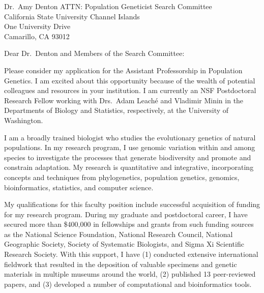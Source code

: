 \documentclass[letterpaper, 10pt]{letter}
\begin{document}
\begin{letter}{Dr.\ Amy Denton
                     ATTN: Population Geneticist Search Committee \\
                     California State University Channel Islands\\
                     One University Drive \\
                     Camarillo, CA 93012}
\opening{Dear Dr.\ Denton and Members of the Search Committee:}
Please consider my application for the Assistant Professorship in Population
Genetics.
I am excited about this opportunity because of the wealth of potential
colleagues and resources in your institution.
I am currently an NSF Postdoctoral Research Fellow working with Drs.\ Adam
Leach\'{e} and Vladimir Minin in the Departments of Biology and
Statistics, respectively, at the University of Washington.

I am a broadly trained biologist who studies the evolutionary genetics of
natural populations.
In my research program, I use genomic variation within and among species to
investigate the processes that generate biodiversity and promote and constrain
adaptation.
My research is quantitative and integrative, incorporating concepts and
techniques from phylogenetics, population genetics, genomics, bioinformatics,
statistics, and computer science.

My qualifications for this faculty position include successful acquisition
of funding for my research program.
During my graduate and postdoctoral career, I have secured more than
\$400,000 in fellowships and grants from such funding sources as the 
National Science Foundation,
National Research Council,
National Geographic Society,
Society of Systematic Biologists, and
Sigma Xi Scientific Research Society.
With this support, I have
(1) conducted extensive international fieldwork that resulted in
the deposition of valuable specimens and genetic materials in multiple
museums around the world,
(2) published 13 peer-reviewed papers, and
(3) developed a number of computational and bioinformatics tools.


\end{letter}
\end{document}
